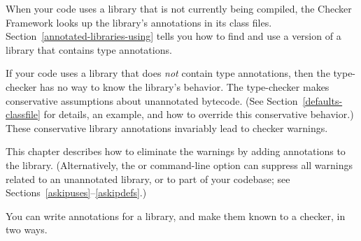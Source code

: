 
When your code uses a library that is not currently being compiled,
the Checker Framework looks up the library's annotations in its class files.
Section~\ref{annotated-libraries-using} tells you how to find and use a
version of a library that contains type annotations.

If your code uses a library that does \emph{not} contain type annotations,
then the type-checker has no way to know the library's behavior.
The type-checker
makes conservative assumptions about unannotated bytecode.
(See
Section~\ref{defaults-classfile} for details, an example, and how to
override this conservative behavior.)
These conservative library
annotations invariably lead to checker warnings.

This chapter describes how to eliminate
the warnings by adding annotations to the library.
(Alternatively, the  or  command-line
option can
suppress all warnings related to an unannotated library, or to part of your
codebase; see
Sections~\ref{askipuses}--\ref{askipdefs}.)

You can write annotations for a library, and make them known to a checker, in two ways.

